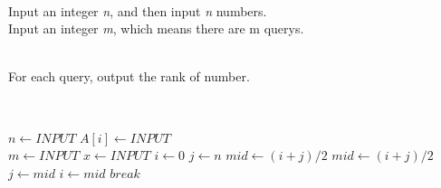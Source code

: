 \documentclass{amsart}
\begin{document}
  \begin{description}
    \large
    \item[INPUT]~\\
    Input an integer \emph{n}, and then input \emph{n} numbers.\\
    Input an integer \emph{m}, which means there are m querys.\\ 
    \item[OUTPUT]~\\
    For each query, output the rank of number.\\
    
    \item[Binary Search Pseudo code]~\\
    \begin{algorithmic}[1]
      \State$n \gets INPUT$
        \State$A[i] \gets INPUT$
      \EndFor
      \\
      \State$m \gets INPUT$
        \State$x \gets INPUT$ 
        \State$i \gets 0$ 
        \State$j \gets n$
        \State$mid \gets (i+j)/2$ 
          \State$mid \gets (i+j)/2$
           
            \State$j \gets mid$ 
          \Else
             
              \State$i \gets mid$ 
            \Else
              \State$break$
            \EndIf
          \EndIf
        \EndWhile
      \EndFor
       
    \end{algorithmic}
  \end{description}
\end{document}
